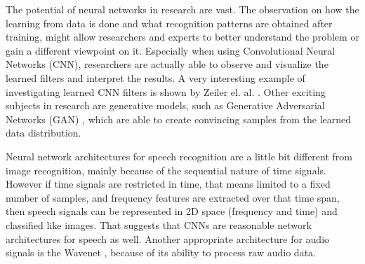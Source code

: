 The potential of neural networks in research are vast.
The observation on how the learning from data is done and what recognition patterns are obtained after training, might allow researchers and experts to better understand the problem or gain a different viewpoint on it.
Especially when using Convolutional Neural Networks (CNN), researchers are actually able to observe and visualize the learned filters and interpret the results.
A very interesting example of investigating learned CNN filters is shown by Zeiler el. al. \cite{Zeiler2013}.
Other exciting subjects in research are generative models, such as Generative Adversarial Networks (GAN) \cite{Goodfellow2014}, which are able to create convincing samples from the learned data distribution.

Neural network architectures for speech recognition are a little bit different from image recognition, mainly because of the sequential nature of time signals.
However if time signals are restricted in time, that means limited to a fixed number of samples, and frequency features are extracted over that time span, then speech signals can be represented in 2D space (frequency and time) and classified like images.
That suggests that CNNs are reasonable network architectures for speech as well.
Another appropriate architecture for audio signals is the Wavenet \cite{Oord2016}, because of its ability to process raw audio data.


